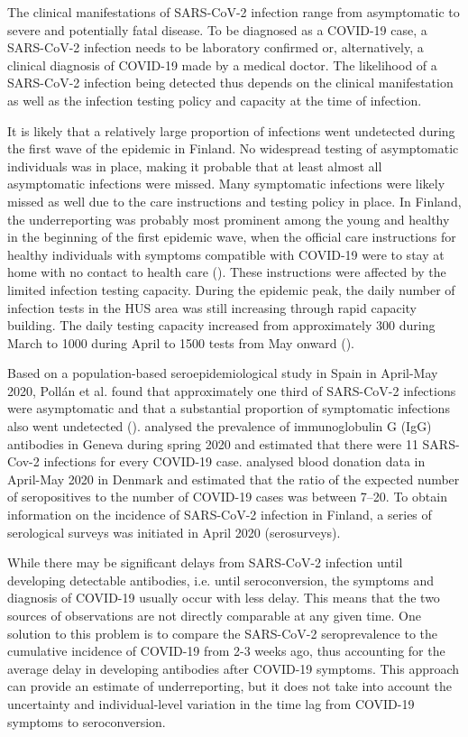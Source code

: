 \documentclass[aoas]{imsart}
\begin{document}
The clinical manifestations of SARS-CoV-2 infection range from asymptomatic to severe and potentially fatal disease. To be diagnosed as a COVID-19 case, a SARS-CoV-2 infection needs to be laboratory confirmed or, alternatively, a clinical diagnosis of COVID-19 made by a medical doctor. The likelihood of a SARS-CoV-2 infection being detected thus depends on the clinical manifestation as well as the infection testing policy and capacity at the time of infection.

It is likely that a relatively large proportion of infections went undetected during the first wave of the epidemic in Finland. No widespread testing of asymptomatic individuals was in place, making it probable that at least almost all asymptomatic infections were missed. Many symptomatic infections were likely missed as well due to the care instructions and testing policy in place. In Finland, the underreporting was probably most prominent among the young and healthy in the beginning of the first epidemic wave, when the official care instructions for healthy individuals with symptoms compatible with COVID-19 were to stay at home with no contact to health care (\cite{huscare202003}). These instructions were affected by the limited infection testing capacity. During the epidemic peak, the daily number of infection tests in the HUS area was still increasing through rapid capacity building. The daily testing capacity increased from approximately 300 during March to 1000 during April to 1500 tests from May onward (\cite{Jarva2020}).

Based on a population-based seroepidemiological study in Spain in April-May 2020, Pollán et al. found that approximately one third of SARS-CoV-2 infections were asymptomatic and that a substantial proportion of symptomatic infections also went undetected (\cite{Pollan2020}). \cite{Stringhini2020} analysed the prevalence of immunoglobulin G (IgG) antibodies in Geneva during spring 2020 and estimated that there were 11 SARS-Cov-2 infections for every COVID-19 case. \cite{erikstrup2020} analysed blood donation data in April-May 2020 in Denmark and estimated that the ratio of the expected number of seropositives to the number of COVID-19 cases was between 7–20. To obtain information on the incidence of SARS-CoV-2 infection in Finland, a series of serological surveys was initiated in April 2020 (serosurveys). 

While there may be significant delays from SARS-CoV-2 infection until developing detectable antibodies, i.e. until seroconversion, the symptoms and diagnosis of COVID-19 usually occur with less delay. This means that the two sources of observations are not directly comparable at any given time. One solution to this problem is to compare the SARS-CoV-2 seroprevalence to the cumulative incidence of COVID-19 from 2-3 weeks ago, thus accounting for the average delay in developing antibodies after COVID-19 symptoms. This approach can provide an estimate of underreporting, but it does not take into account the uncertainty and individual-level variation in the time lag from COVID-19 symptoms to seroconversion. 
\end{document}
